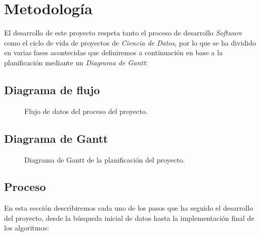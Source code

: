 
\chapter{Metodología}
\label{metodologia}

El desarrollo de este proyecto respeta tanto el proceso de desarrollo \textit{Software} como el ciclo de vida de proyectos de \textit{Ciencia de Datos}, por lo que se ha dividido en varias fases acontecidas que definiremos a continuación en base a la planificación mediante un \textit{Diagrama de Gantt}:


\section{Diagrama de flujo}

    \begin{figure}[H]
        \centering
        
        \caption{Flujo de datos del proceso del proyecto.}
        \label{DataflowImage}
    \end{figure}

\section{Diagrama de Gantt}

    \begin{figure}[H]
        \centering
        
        \caption{Diagrama de Gantt de la planificación del proyecto.}
        \label{GranttImage}
    \end{figure}

\section{Proceso}

    En esta sección describiremos cada uno de los pasos que ha seguido el desarrollo del proyecto, desde la búsqueda inicial de datos hasta la implementación final de los algoritmos:

